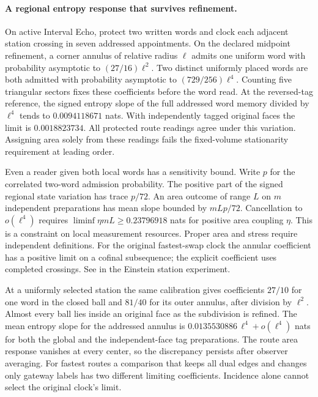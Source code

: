 \documentclass[11pt]{article}
\begin{document}
\paragraph{A regional entropy response that survives refinement.}
On active Interval Echo, protect two written words and clock each adjacent
station crossing in seven addressed appointments. On the declared midpoint
refinement, a corner annulus of relative radius $\ell$ admits one uniform
word with probability asymptotic to $(27/16)\ell^2$. Two distinct uniformly
placed words are both admitted with probability asymptotic to
$(729/256)\ell^4$. Counting five triangular sectors fixes these coefficients
before the word read. At the reversed-tag reference, the signed entropy
slope of the full addressed word memory divided by $\ell^4$ tends to
$0.0094118671$ nats. With independently tagged original faces the limit is
$0.0018823734$. All protected route readings agree under this variation.
Assigning area solely from these readings fails the fixed-volume
stationarity requirement at leading order.

Even a reader given both local words has a sensitivity bound. Write $p$
for the correlated two-word admission probability. The positive part
of the signed regional state variation has trace $p/72$. An area outcome
of range $L$ on $m$ independent preparations has mean slope bounded by
$mLp/72$. Cancellation to $o(\ell^4)$ requires
$\liminf\eta mL\ge 0.23796918$ nats for positive area coupling $\eta$.
This is a constraint on local measurement resources. Proper area and
stress require independent definitions. For the original fastest-swap
clock the annular coefficient has a positive limit on a cofinal subsequence;
the explicit coefficient uses completed crossings.
See  in the Einstein station experiment.

At a uniformly selected station the same calibration gives coefficients
$27/10$ for one word in the closed ball and $81/40$ for its outer
annulus, after division by $\ell^2$. Almost every ball lies inside an
original face as the subdivision is refined. The mean entropy slope for
the addressed annulus is $0.0135530886\,\ell^4+o(\ell^4)$ nats for
both the global and the independent-face tag preparations. The route
area response vanishes at every center, so the discrepancy persists
after observer averaging. For fastest routes a comparison that keeps all
dual edges and changes only gateway labels has two different limiting
coefficients. Incidence alone cannot select the original clock's limit.
\end{document}
